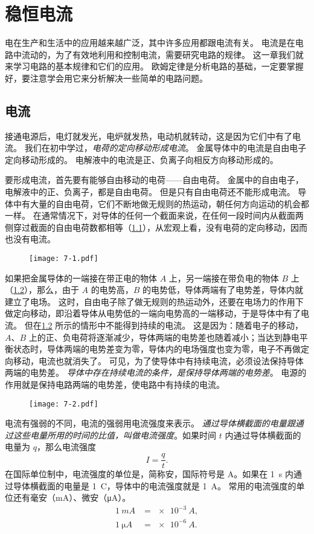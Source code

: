 \chapter{稳恒电流}
电在生产和生活中的应用越来越广泛，其中许多应用都跟电流有关。
电流是在电路中流动的，为了有效地利用和控制电流，需要研究电路的规律。
这一章我们就来学习电路的基本规律和它们的应用。
欧姆定律是分析电路的基础，一定要掌握好，要注意学会用它来分析解决一些简单的电路问题。

\section{电流}
接通电源后，电灯就发光，电炉就发热，电动机就转动，这是因为它们中有了电流。
我们在初中学过，\emph{电荷的定向移动形成电流}。
金属导体中的电流是自由电子定向移动形成的。
电解液中的电流是正、负离子向相反方向移动形成的。

要形成电流，首先要有能够自由移动的电荷——自由电荷。
金属中的自由电子，电解液中的正、负离子，都是自由电荷。
但是只有自由电荷还不能形成电流。
导体中有大量的自由电荷，它们不断地做无规则的热运动，朝任何方向运动的机会都一样。
在通常情况下，对导体的任何一个截面来说，在任何一段时间内从截面两侧穿过截面的自由电荷数都相等（\cref{fig:7-1}），从宏观上看，没有电荷的定向移动，因而也没有电流。
\begin{figure}
  \texttt{[image: 7-1.pdf]}
  \caption{}\label{fig:7-1} 
\end{figure}

如果把金属导体的一端接在带正电的物体 $A$ 上，另一端接在带负电的物体 $B$ 上（\cref{fig:7-2}），那么，由于 $A$ 的电势高，$B$ 的电势低，导体两端有了电势差，导体内就建立了电场。
这时，自由电子除了做无规则的热运动外，还要在电场力的作用下做定向移动，即沿着导体从电势低的一端向电势高的一端移动，于是导体中有了电流。
但在\cref{fig:7-2} 所示的情形中不能得到持续的电流。
这是因为：随着电子的移动，$A$、$B$ 上的正、负电荷将逐渐减少，导体两端的电势差也随着减小；当达到静电平衡状态时，导体两端的电势差变为零，导体内的电场强度也变为零，电子不再做定向移动，电流也就消失了。
可见，为了使导体中有持续电流，必须设法保持导体两端的电势差。
\emph{导体中存在持续电流的条件，是保持导体两端的电势差}。
电源的作用就是保持电路两端的电势差，使电路中有持续的电流。
\begin{figure}
  \texttt{[image: 7-2.pdf]}
  \caption{}\label{fig:7-2}
\end{figure}

电流有强弱的不同，电流的强弱用电流强度来表示。
\emph{通过导体横截面的电量跟通过这些电量所用的时间的比值，叫做电流强度}。如果时间 $t$ 内通过导体横截面的电量为 $q$，那么电流强度
\[I=\frac{q}{t}.\]
在国际单位制中，电流强度的单位是，简称安，国际符号是 \unit{A}。如果在 \qty{1}{s} 内通过导体横截面的电量是 \qty{1}{C}，导体中的电流强度就是 \qty{1}{A}。
常用的电流强度的单位还有毫安（\unit{mA}）、微安（\unit{\micro A}）。
\[\begin{split}
    \qty{1}{mA}      &= \qty{e-3}{A},\\
    \qty{1}{\micro A}&= \qty{e-6}{A}.
\end{split}\]

